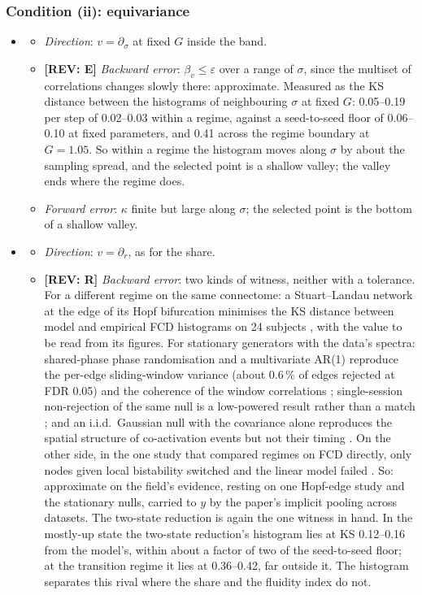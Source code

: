 \documentclass[11pt]{article}
\newcommand{\REV}[1]{\textcolor{purple!70!black}{\textbf{[REV: #1]}}}
\begin{document}
\subsubsection{Condition (ii): equivariance}
\begin{itemize}
\item[$\Theta_1$]
  \begin{itemize}
  \item \emph{Direction}: $v=\partial_\sigma$ at fixed $G$ inside the band.
  \item \REV{E} \emph{Backward error}: $\beta_v\le\varepsilon$ over a range of $\sigma$, since the multiset of correlations changes slowly there: approximate. Measured as the KS distance between the histograms of neighbouring $\sigma$ at fixed $G$: 0.05--0.19 per step of 0.02--0.03 within a regime, against a seed-to-seed floor of 0.06--0.10 at fixed parameters, and 0.41 across the regime boundary at $G=1.05$. So within a regime the histogram moves along $\sigma$ by about the sampling spread, and the selected point is a shallow valley; the valley ends where the regime does.
  \item \emph{Forward error}: $\kappa$ finite but large along $\sigma$; the selected point is the bottom of a shallow valley.
  \end{itemize}
\item[$\Theta_2$]
  \begin{itemize}
  \item \emph{Direction}: $v=\partial_r$, as for the share.
  \item \REV{R} \emph{Backward error}: two kinds of witness, neither with a tolerance. For a different regime on the same connectome: a Stuart--Landau network at the edge of its Hopf bifurcation minimises the KS distance between model and empirical FCD histograms on 24 subjects \parencite{deco2017}, with the value to be read from its figures. For stationary generators with the data's spectra: shared-phase phase randomisation and a multivariate AR(1) reproduce the per-edge sliding-window variance (about 0.6\,\% of edges rejected at FDR 0.05) and the coherence of the window correlations \parencite{liegeois2017}; single-session non-rejection of the same null is a low-powered result rather than a match \parencite{hindriks2016}; and an i.i.d.\ Gaussian null with the covariance alone reproduces the spatial structure of co-activation events but not their timing \parencite{novelli2022}. On the other side, in the one study that compared regimes on FCD directly, only nodes given local bistability switched and the linear model failed \parencite{hansen2015}. So: approximate on the field's evidence, resting on one Hopf-edge study and the stationary nulls, carried to $y$ by the paper's implicit pooling across datasets. The two-state reduction is again the one witness in hand. In the mostly-up state the two-state reduction's histogram lies at KS 0.12--0.16 from the model's, within about a factor of two of the seed-to-seed floor; at the transition regime it lies at 0.36--0.42, far outside it. The histogram separates this rival where the share and the fluidity index do not.

\end{itemize}
\end{itemize}
\end{document}
